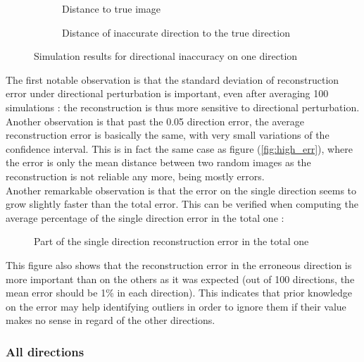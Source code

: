 \documentclass[titlepage,11pt]{article}
\begin{document}
	\begin{figure}[H]
		\centering
		\begin{subfigure}{.5\textwidth}
			\centering
			
			\caption{Distance to true image}
		\end{subfigure}%
		\begin{subfigure}{.5\textwidth}
			\centering
			
			\caption{Distance of inaccurate direction to the true direction}
		\end{subfigure}
		\caption{Simulation results for directional inaccuracy on one direction}
	\end{figure}

	The first notable observation is that the standard deviation of reconstruction error under directional perturbation is important, even after averaging 100 simulations : the reconstruction is thus more sensitive to directional perturbation. Another observation is that past the 0.05 direction error, the average reconstruction error is basically the same, with very small variations of the confidence interval. This is in fact the same case as figure (\ref{fig:high_err}), where the error is only the mean distance between two random images as the reconstruction is not reliable any more, being mostly errors. \\
	
	Another remarkable observation is that the error on the single direction seems to grow slightly faster than the total error. This can be verified when computing the average percentage of the single direction error in the total one :
	
	\begin{figure}[H]
		\centering
		
		\caption{Part of the single direction reconstruction error in the total one}
	\end{figure}

	This figure also shows that the reconstruction error in the erroneous direction is more important than on the others as it was expected (out of 100 directions, the mean error should be 1\% in each direction). This indicates that prior knowledge on the error may help identifying outliers in order to ignore them if their value makes no sense in regard of the other directions.
	
	\subsubsection{All directions}
	
\end{document}
